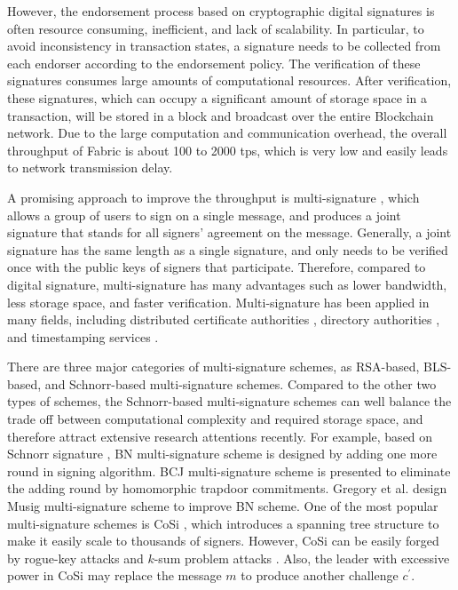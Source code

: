 \documentclass[journal]{IEEEtran}
\begin{document}
However, the endorsement process based on cryptographic digital signatures is often resource consuming, inefficient, and lack of scalability. In particular, to avoid inconsistency in transaction states, a signature needs to be collected from each endorser according to the endorsement policy. The verification of these signatures consumes large amounts of computational resources. After verification, these signatures, which can occupy a significant amount of storage space in a transaction, will be stored in a block and broadcast over the entire Blockchain network. Due to the large computation and communication overhead, the overall throughput of Fabric is about 100 to 2000 tps, which is very low and easily leads to network transmission delay.

A promising approach to improve the throughput is multi-signature \cite{18itakura1983public}, which allows a group of users to sign on a single message, and produces a joint signature that stands for all signers' agreement on the message. Generally, a joint signature has the same length as a single signature, and only needs to be verified once with the public keys of signers that participate. Therefore, compared to digital signature, multi-signature has many advantages such as lower bandwidth, less storage space, and faster verification. Multi-signature has been applied in many fields, including distributed certificate authorities \cite{45DBLP:conf/ccs/SzalachowskiMP14}, directory authorities \cite{38DBLP:journals/corr/SytaTVWF15}, and timestamping services \cite{02DBLP:conf/sp/SytaTVWJGGKF16}.

There are three major categories of multi-signature schemes, as RSA-based, BLS-based, and Schnorr-based multi-signature schemes. Compared to the other two types of schemes, the Schnorr-based multi-signature schemes can well balance the trade off between computational complexity and required storage space, and therefore attract extensive research attentions recently. For example, based on Schnorr signature \cite{09DBLP:journals/joc/Schnorr91}, BN multi-signature scheme \cite{04DBLP:conf/ccs/BellareN06} is designed by adding one more round in signing algorithm. BCJ multi-signature scheme \cite{35DBLP:conf/ccs/BagherzandiCJ08} is presented to eliminate the adding round by homomorphic trapdoor commitments. Gregory et al. design Musig multi-signature scheme \cite{DBLP:journals/dcc/MaxwellPSW19} to improve BN scheme. One of the most popular multi-signature schemes is CoSi \cite{02DBLP:conf/sp/SytaTVWJGGKF16}, which introduces a spanning tree structure to make it easily scale to thousands of signers. However, CoSi can be easily forged by rogue-key attacks and \(k\)-sum problem attacks \cite{03drijverssecurity}. Also, the leader with excessive power in CoSi may replace the message \(m\) to produce another challenge \(c^\prime\).
\end{document}

